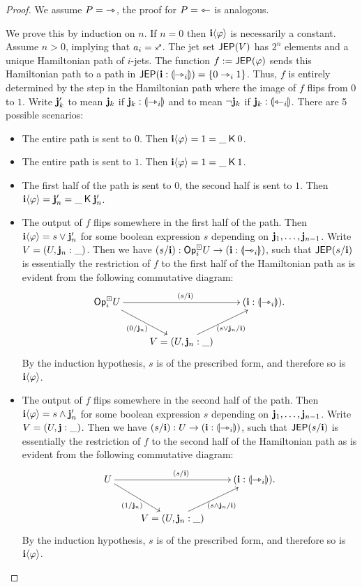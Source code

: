 \documentclass[a4paper]{article}
\begin{document}
\begin{proof}
	We assume $P = {\rightarrowtriangle}$, the proof for $P = {\leftarrowtriangle}$ is analogous.

	We prove this by induction on $n$.
	If $n = 0$ then $\mathbf{i} \langle \varphi \rangle$ is necessarily a constant.
	Assume $n > 0$, implying that $a_i = \ypolar$.
	The jet set $\mathsf{JEP}(V)$ has $2^n$ elements and a unique Hamiltonian path of $i$-jets.
	The function $f := \mathsf{JEP}(\varphi)$ sends this Hamiltonian path to a path in $\mathsf{JEP}(\mathbf{i} : {\llparenthesis \rightarrowtriangle_i \rrparenthesis}) = \mathopen{}\left\{ 0 \rightarrowtriangle_i 1 \right\}\mathclose{}$.
	Thus, $f$ is entirely determined by the step in the Hamiltonian path where the image of $f$ flips from $0$ to $1$.
	Write $\mathbf{j}_k'$ to mean $\mathbf{j}_k$ if $\mathbf{j}_k : {\llparenthesis \rightarrowtriangle_i \rrparenthesis}$ and to mean $\lnot \mathbf{j}_k$ if $\mathbf{j}_k : {\llparenthesis \leftarrowtriangle_i \rrparenthesis}$.
	There are 5 possible scenarios:
	\begin{itemize}
		\item The entire path is sent to $0$. Then $\mathbf{i} \langle \varphi \rangle = 1 = \_ \mathbin{\mathsf{K}} 0$.
		\item The entire path is sent to $1$. Then $\mathbf{i} \langle \varphi \rangle = 1 = \_ \mathbin{\mathsf{K}} 1$.
		\item The first half of the path is sent to $0$, the second half is sent to $1$. Then $\mathbf{i} \langle \varphi \rangle = \mathbf{j}_n' = \_ \mathbin{\mathsf{K}} \mathbf{j}_n'$.
		\item The output of $f$ flips somewhere in the first half of the path.
		Then $\mathbf{i} \langle \varphi \rangle = s \vee \mathbf{j}_n'$ for some boolean expression $s$ depending on $\mathbf{j}_1, \ldots, \mathbf{j}_{n-1}$.
		Write $V = (U, \mathbf{j}_n : \_)$.
		Then we have $(s/\mathbf{i}) : {\mathsf{Op}}^\boxdot_i U \to (\mathbf{i} : {\llparenthesis \rightarrowtriangle_i \rrparenthesis})$, such that $\mathsf{JEP}(s/\mathbf{i})$ is essentially the restriction of $f$ to the first half of the Hamiltonian path as is evident from the following commutative diagram:
		\[
			\xymatrix{
				\Opcube_i U
					\ar[rr]^{(s/\dm i)}
					\ar[rd]_{(0/\dm j_n)}
				&&
				(\dm i : \rival{\jet_i}).
				\\
				& V = (U, \dm j_n : \_)
					\ar[ru]_{(s \vee \dm j_n / \dm i)}
			}
		\]
		By the induction hypothesis, $s$ is of the prescribed form, and therefore so is $\mathbf{i} \langle \varphi \rangle$.
		\item The output of $f$ flips somewhere in the second half of the path.
		Then $\mathbf{i} \langle \varphi \rangle = s \wedge \mathbf{j}_n'$ for some boolean expression $s$ depending on $\mathbf{j}_1, \ldots, \mathbf{j}_{n-1}$.
		Write $V = (U, \mathbf{j} : \_)$.
		Then we have $(s/\mathbf{i}) : U \to (\mathbf{i} : {\llparenthesis \rightarrowtriangle_i \rrparenthesis})$, such that $\mathsf{JEP}(s/\mathbf{i})$ is essentially the restriction of $f$ to the second half of the Hamiltonian path as is evident from the following commutative diagram:
		\[
			\xymatrix{
				U
					\ar[rr]^{(s/\dm i)}
					\ar[rd]_{(1/\dm j_n)}
				&&
				(\dm i : \rival{\jet_i}).
				\\
				& V = (U, \dm j_n : \_)
					\ar[ru]_{(s \wedge \dm j_n / \dm i)}
			}
		\]
		By the induction hypothesis, $s$ is of the prescribed form, and therefore so is $\mathbf{i} \langle \varphi \rangle$. \qedhere
	\end{itemize}
\end{proof}
\end{document}
